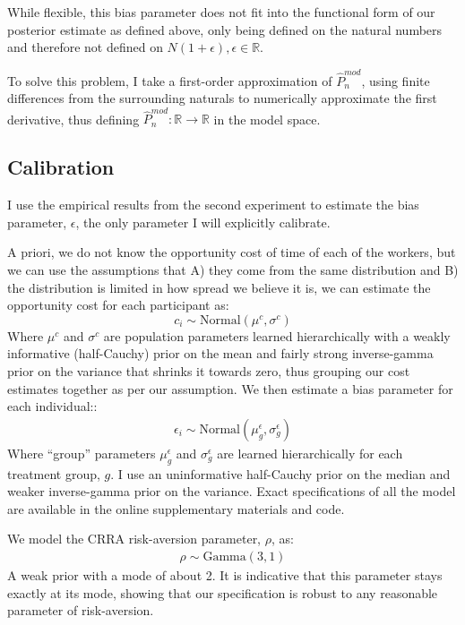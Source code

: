 \documentclass[a4paper,12pt]{article}
\begin{document}
While flexible, this bias parameter does not fit into the functional form of our posterior estimate as defined above, only being defined on the natural numbers and therefore not defined on $N(1 + \epsilon), \epsilon \in \mathbb{R}$.

To solve this problem, I take a first-order approximation of $\hat{P}^{mod}_n$, using finite differences from the surrounding naturals to numerically approximate the first derivative, thus defining $\hat{P}^{mod}_n: \mathbb{R} \rightarrow \mathbb{R}$ in the model space.

\subsection{ Calibration }

I use the empirical results from the second experiment to estimate the bias parameter, $\epsilon$, the only parameter I will explicitly calibrate.

A priori, we do not know the opportunity cost of time of each of the workers, but we can use the assumptions that A) they come from the same distribution and B) the distribution is limited in how spread we believe it is, we can estimate the opportunity cost for each participant as:
$$
c_i \sim \text{Normal}(\mu^c, \sigma^c)
$$
Where $\mu^c$ and $\sigma^c$ are population parameters learned hierarchically with a weakly informative (half-Cauchy) prior on the mean and fairly strong inverse-gamma prior on the variance that shrinks it towards zero, thus grouping our cost estimates together as per our assumption. We then estimate a bias parameter for each individual::
\begin{align*}
  \epsilon_i \sim \text{Normal}(\mu^{\epsilon}_g, \sigma^{\epsilon}_g)
\end{align*}
Where ``group'' parameters $\mu^{\epsilon}_g$ and $\sigma^{\epsilon}_g$ are learned hierarchically for each treatment group, $g$. I use an uninformative half-Cauchy prior on the median and weaker inverse-gamma prior on the variance. Exact specifications of all the model are available in the online supplementary materials and code.

We model the CRRA risk-aversion parameter, $\rho$, as:
\begin{align*}
  \rho \sim \text{Gamma}(3, 1)
\end{align*}
A weak prior with a mode of about 2. It is indicative that this parameter stays exactly at its mode, showing that our specification is robust to any reasonable parameter of risk-aversion.
\end{document}
